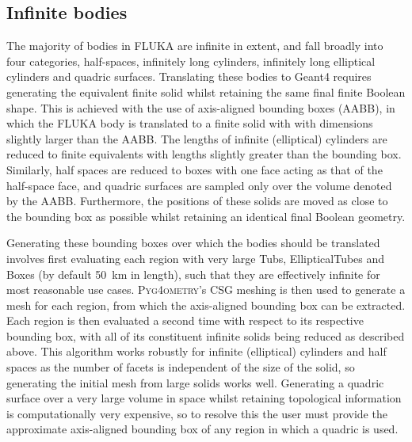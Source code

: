 \documentclass[final,5p,times,twocolumn]{elsarticle}
\newcommand{\PYGEOMETRY}{\textsc{Pyg4ometry}}
\begin{document}
\subsection{Infinite bodies}
The majority of bodies in FLUKA are infinite in extent, and fall
broadly into four categories, half-spaces, infinitely long cylinders,
infinitely long elliptical cylinders and quadric surfaces.
Translating these bodies to Geant4 requires generating the equivalent
finite solid whilst retaining the same final finite Boolean shape.
This is achieved with the use of axis-aligned bounding boxes (AABB),
in which the FLUKA body is translated to a finite solid with with
dimensions slightly larger than the AABB.  The lengths of infinite
(elliptical) cylinders are reduced to finite equivalents with lengths
slightly greater than the bounding box.  Similarly, half spaces are
reduced to boxes with one face acting as that of the half-space face,
and quadric surfaces are sampled only over the volume denoted by the
AABB.  Furthermore, the positions of these solids are moved as close
to the bounding box as possible whilst retaining an identical final
Boolean geometry.

Generating these bounding boxes over which the bodies should be
translated involves first evaluating each region with very large Tubs,
EllipticalTubes and Boxes (by default \SI{50}{\km} in length), such
that they are effectively infinite for most reasonable use cases.
\PYGEOMETRY{}'s CSG meshing is then used to generate a mesh for each
region, from which the axis-aligned bounding box can be extracted.
Each region is then evaluated a second time with respect to its
respective bounding box, with all of its constituent infinite solids
being reduced as described above.  This algorithm works robustly for
infinite (elliptical) cylinders and half spaces as the number of
facets is independent of the size of the solid, so generating the
initial mesh from large solids works well.  Generating a quadric
surface over a very large volume in space whilst retaining topological
information is computationally very expensive, so to resolve this the
user must provide the approximate axis-aligned bounding box of any
region in which a quadric is used.
\end{document}

